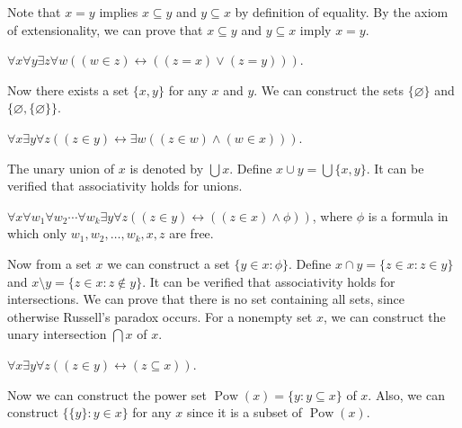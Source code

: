 \documentclass[11pt]{article}
\DeclareMathOperator{\pow}{Pow}
\begin{document}
Note that $x = y$ implies $x \subseteq y$ and $y \subseteq x$ by definition of equality.
By the axiom of extensionality, we can prove that $x \subseteq y$ and $y \subseteq x$ imply $x = y$.

\begin{axiom}[Pairing]
  $\forall x \forall y \exists z \forall w ((w \in z) \leftrightarrow ((z = x) \vee (z = y)))$.
\end{axiom}

Now there exists a set $\{x, y\}$ for any $x$ and $y$.
We can construct the sets $\{\varnothing\}$ and $\{\varnothing, \{\varnothing\}\}$.

\begin{axiom}[Union]
  $\forall x \exists y \forall z ((z \in y) \leftrightarrow \exists w ((z \in w) \wedge (w \in x)))$.
\end{axiom}

The unary union of $x$ is denoted by $\bigcup x$.
Define $x \cup y = \bigcup \{x, y\}$.
It can be verified that associativity holds for unions.

\begin{axiomschema}[Separation]
  $\forall x \forall w_1 \forall w_2 \cdots \forall w_k \exists y \forall z ((z \in y) \leftrightarrow ((z \in x) \wedge \phi))$, where $\phi$ is a formula in which only $w_1, w_2, \dots, w_k, x, z$ are free.
\end{axiomschema}

Now from a set $x$ we can construct a set $\{y \in x: \phi\}$.
Define $x \cap y = \{z \in x: z \in y\}$ and $x \setminus y = \{z \in x: z \notin y\}$.
It can be verified that associativity holds for intersections.
We can prove that there is no set containing all sets, since otherwise Russell's paradox occurs.
For a nonempty set $x$, we can construct the unary intersection $\bigcap x$ of $x$.

\begin{axiom}
  $\forall x \exists y \forall z ((z \in y) \leftrightarrow (z \subseteq x))$.
\end{axiom}

Now we can construct the power set $\pow(x) = \{y: y \subseteq x\}$ of $x$.
Also, we can construct $\{\{y\}: y \in x\}$ for any $x$ since it is a subset of $\pow(x)$.
\end{document}
